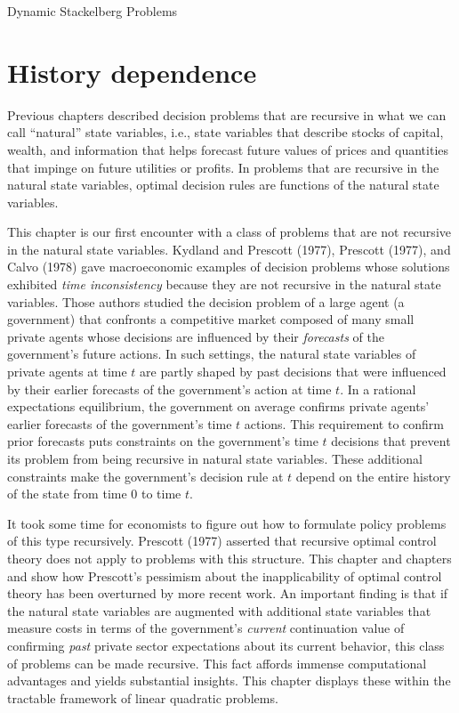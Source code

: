 
Dynamic Stackelberg Problems


\section{History dependence}

  Previous chapters described decision problems that are recursive in
what we can call ``natural'' state variables, i.e., state variables that
describe stocks of capital, wealth, and information that helps forecast
future values of prices and quantities that impinge on future utilities
or profits.  In problems that are recursive in the natural state variables,
optimal decision rules are functions of the natural state variables.

 This chapter is our first encounter with a class of
problems that are not recursive in the natural state variables.
Kydland and Prescott (1977), Prescott (1977),  and Calvo (1978) gave
macroeconomic examples of decision problems
whose solutions  exhibited {\it time inconsistency\/}
because they are not recursive in the natural state variables.
Those authors studied the decision problem of  a large agent
(a government) that confronts  a competitive market composed of many small private
agents
whose decisions are influenced by their
{\it forecasts\/} of the government's future actions.  In such
settings, the natural state variables of private agents at time
$t$ are partly shaped by past  decisions
that were influenced by their earlier forecasts of the government's action
at time $t$.  In a rational expectations equilibrium,
 the government  on average confirms private agents' earlier forecasts of
the government's time $t$ actions.  This requirement to confirm prior forecasts
puts constraints on the government's
time $t$ decisions that prevent its problem  from being
recursive in  natural state variables.
These additional constraints make the government's
decision rule at $t$ depend on the entire history of the
state from time $0$ to time $t$.

It took some time for economists to figure out how to formulate policy problems of this type
recursively.
Prescott  (1977) asserted that
 recursive optimal control theory does not apply
to problems with this structure.  This chapter and chapters
 and  show
how Prescott's pessimism about the inapplicability
of optimal control theory has been overturned
by more recent work.
An important finding is that if the natural state variables
are augmented with  additional state variables that measure
 costs in terms of the government's {\it current\/} continuation
value of confirming {\it past\/} private sector expectations about its
current behavior, this class of problems
can be made recursive. This fact affords immense
computational advantages and yields substantial insights.
  This chapter displays these
within the tractable framework of linear quadratic problems.


